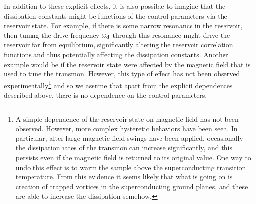 In addition to these explicit effects, it is also possible to imagine that the dissipation constants might be functions of the control parameters via the reservoir state. For example, if there is some narrow resonance in the reservoir, then tuning the drive frequency $\omega_{\text{d}}$ through this resonance might drive the reservoir far from equilibrium, significantly altering the reservoir correlation functions and thus potentially affecting the dissipation constants. Another example would be if the reservoir state were affected by the magnetic field that is used to tune the transmon. However, this type of effect has not been observed experimentally\footnote{A simple dependence of the reservoir state on magnetic field has not been observed. However, more complex hysteretic behaviors have been seen. In particular, after large magnetic field swings have been applied, occasionally the dissipation rates of the transmon can increase significantly, and this persists even if the magnetic field is returned to its original value. One way to undo this effect is to warm the sample above the superconducting transition temperature. From this evidence it seems likely that what is going on is creation of trapped vortices in the superconducting ground planes, and these are able to increase the dissipation somehow.} and so we assume that apart from the explicit dependences described above, there is no dependence on the control parameters.
%
